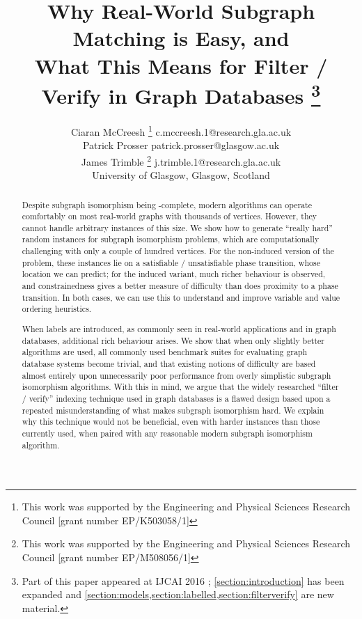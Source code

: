 \documentclass[twoside,11pt]{article}
\newcommand{\citep}[1]{\cite{#1}}
\begin{document}
\title{Why Real-World Subgraph Matching is Easy, and \\ What This Means for Filter / Verify in
Graph Databases \thanks{Part of this paper appeared at IJCAI 2016
\citep{DBLP:conf/ijcai/McCreeshPT16}; \cref{section:introduction} has been expanded and
\cref{section:models,section:labelled,section:filterverify} are new material.}}

\author{\name Ciaran McCreesh \thanks{This work was supported by the Engineering and Physical Sciences
           Research Council [grant number EP/K503058/1]} \email c.mccreesh.1@research.gla.ac.uk \\
       \name Patrick Prosser \email patrick.prosser@glasgow.ac.uk \\
       \name James Trimble \thanks{This work was supported by the Engineering and Physical Sciences
           Research Council [grant number EP/M508056/1]} \email j.trimble.1@research.gla.ac.uk \\
   \addr University of Glasgow, Glasgow, Scotland}
\maketitle

\begin{abstract}
    Despite subgraph isomorphism being \NP-complete, modern algorithms can operate comfortably on
    most real-world graphs with thousands of vertices. However, they cannot handle arbitrary instances of
    this size. We show how to generate ``really hard'' random instances for subgraph isomorphism
    problems, which are computationally challenging with only a couple of hundred vertices. For the
    non-induced version of the problem, these instances lie on a satisfiable / unsatisfiable phase
    transition, whose location we can predict; for the induced variant, much richer behaviour is
    observed, and constrainedness gives a better measure of difficulty than does proximity to a
    phase transition. In both cases, we can use this to understand and improve variable and value
    ordering heuristics.

    When labels are introduced, as commonly seen in real-world applications and in graph databases,
    additional rich behaviour arises.  We show that when only slightly better algorithms are used,
    all commonly used benchmark suites for evaluating graph database systems become trivial, and
    that existing notions of difficulty are based almost entirely upon unnecessarily poor
    performance from overly simplistic subgraph isomorphism algorithms. With this in mind, we argue
    that the widely researched ``filter / verify'' indexing technique used in graph databases is a
    flawed design based upon a repeated misunderstanding of what makes subgraph isomorphism hard. We
    explain why this technique would not be beneficial, even with harder instances than those
    currently used, when paired with any reasonable modern subgraph isomorphism algorithm.
\end{abstract}
\end{document}
